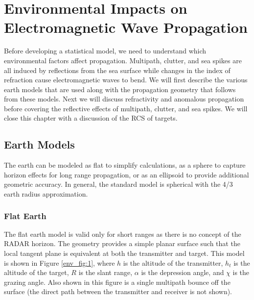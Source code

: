 \renewcommand{\baselinestretch}{2} \small\normalsize
\chapter{Environmental Impacts on Electromagnetic Wave Propagation}
Before developing a statistical model, we need to understand which environmental factors affect propagation. Multipath, clutter, and sea spikes are all induced by reflections from the sea surface while changes in the index of refraction cause electromagnetic waves to bend. We will first describe the various earth models that are used along with the propagation geometry that follows from these models. Next we will discuss refractivity and anomalous propagation before covering the reflective effects of multipath, clutter, and sea spikes. We will close this chapter with a discussion of the RCS of targets.

\section{Earth Models}
The earth can be modeled as flat to simplify calculations, as a sphere to capture horizon effects for long range propagation, or as an ellipsoid to provide additional geometric accuracy. In general, the standard model is spherical with the 4/3 earth radius approximation.

\subsection{Flat Earth}
The flat earth model is valid only for short ranges as there is no concept of the RADAR horizon. The geometry provides a simple planar surface such that the local tangent plane is equivalent at both the transmitter and target. This model is shown in Figure \ref{env_fig:1}, where $h$ is the altitude of the transmitter, $h_t$ is the altitude of the target, $R$ is the slant range, $\alpha$ is the depression angle, and $\chi$ is the grazing angle. Also shown in this figure is a single multipath bounce off the surface (the direct path between the transmitter and receiver is not shown). 

